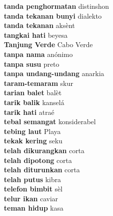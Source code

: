 \textbf{ tanda penghormatan  } distinshon \\
\textbf{ tanda tekanan bunyi  } dialekto \\
\textbf{ tanda tekanan  } aksènt \\
\textbf{ tangkai hati  } beyesa \\
\textbf{ Tanjung Verde  } Cabo Verde \\
\textbf{ tanpa nama  } anónimo \\
\textbf{ tanpa susu  } preto \\
\textbf{ tanpa undang-undang  } anarkia \\
\textbf{ taram-temaram  } skur \\
\textbf{ tarian balet  } balèt \\
\textbf{ tarik balik  } kanselá \\
\textbf{ tarik hati  } atraé \\
\textbf{ tebal semangat  } konsiderabel \\
\textbf{ tebing laut  } Playa \\
\textbf{ tekak kering  } seku \\
\textbf{ telah dikurangkan  } corta \\
\textbf{ telah dipotong  } corta \\
\textbf{ telah diturunkan  } corta \\
\textbf{ telah putus  } kibra \\
\textbf{ telefon bimbit  } sèl \\
\textbf{ telur ikan  } caviar \\
\textbf{ teman hidup  } kasa \\
